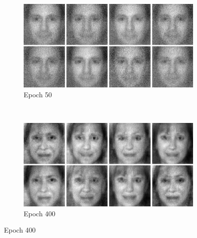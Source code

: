 \begin{figure}[h!]
    \centering
    \begin{subfigure}[b]{0.45\textwidth}
        \includegraphics[width=\textwidth]{fig/vae/caltech_epoch50}
        \caption{Epoch 50}
    \end{subfigure}
    ~
    \begin{subfigure}[b]{0.45\textwidth}
         \includegraphics[width=\textwidth]{fig/vae/caltech_epoch400}
        \caption{Epoch 400}
    \end{subfigure}


\end{figure}
